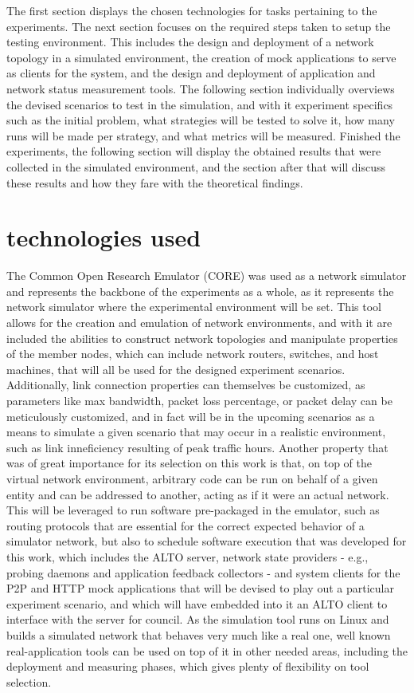     The first section displays the chosen technologies for tasks pertaining to the experiments.
    The next section focuses on the required steps taken to setup the testing environment.
    This includes the design and deployment of a network topology in a simulated environment, the creation of mock applications to serve as clients for the system, and the design and deployment of application and network status measurement tools.
    The following section individually overviews the devised scenarios to test in the simulation, and with it experiment specifics such as the initial problem, what strategies will be tested to solve it, how many runs will be made per strategy, and what metrics will be measured.
    Finished the experiments, the following section will display the obtained results that were collected in the simulated environment, and the section after that will discuss these results and how they fare with the theoretical findings.

\section{technologies used}

    The Common Open Research Emulator (CORE) \cite{core} was used as a network simulator and represents the backbone of the experiments as a whole, as it represents the network simulator where the experimental environment will be set.
    This tool allows for the creation and emulation of network environments, and with it are included the abilities to construct network topologies and manipulate properties of the member nodes, which can include network routers, switches, and host machines, that will all be used for the designed experiment scenarios.
    Additionally, link connection properties can themselves be customized, as parameters like max bandwidth, packet loss percentage, or packet delay can be meticulously customized, and in fact will be in the upcoming scenarios as a means to simulate a given scenario that may occur in a realistic environment, such as link inneficiency resulting of peak traffic hours.
    Another property that was of great importance for its selection on this work is that, on top of the virtual network environment, arbitrary code can be run on behalf of a given entity and can be addressed to another, acting as if it were an actual network.
    This will be leveraged to run software pre-packaged in the emulator, such as routing protocols that are essential for the correct expected behavior of a simulator network, but also to schedule software execution that was developed for this work, which includes the ALTO server, network state providers - e.g., probing daemons and application feedback collectors - and system clients for the P2P and HTTP mock applications that will be devised to play out a particular experiment scenario, and which will have embedded into it an ALTO client to interface with the server for council. 
    As the simulation tool runs on Linux and builds a simulated network that behaves very much like a real one, well known real-application tools can be used on top of it in other needed areas, including the deployment and measuring phases, which gives plenty of flexibility on tool selection. 

